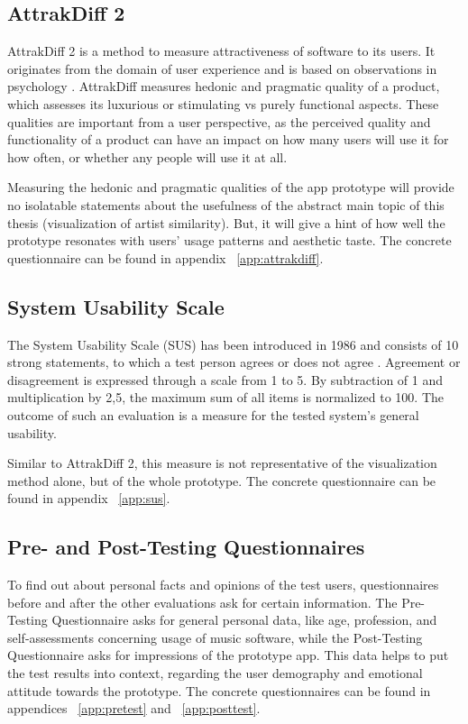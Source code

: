 \subsection{AttrakDiff 2}

AttrakDiff 2 \cite{tubiblio21687} is a method to measure attractiveness of software to its users. It originates from the domain of user experience and is based on observations in psychology \cite{DBLP:journals/ijhci/Hassenzahl01}. AttrakDiff measures hedonic and pragmatic quality of a product, which assesses its luxurious or stimulating vs purely functional aspects. These qualities are important from a user perspective, as the perceived quality and functionality of a product can have an impact on how many users will use it for how often, or whether any people will use it at all.

Measuring the hedonic and pragmatic qualities of the app prototype will provide no isolatable statements about the usefulness of the abstract main topic of this thesis (visualization of artist similarity). But, it will give a hint of how well the prototype resonates with users' usage patterns and aesthetic taste. The concrete questionnaire can be found in appendix ~\ref{app:attrakdiff}.

\subsection{System Usability Scale}

The System Usability Scale (SUS) has been introduced in 1986 and consists of 10 strong statements, to which a test person agrees or does not agree \cite{Lewis:2009}. Agreement or disagreement is expressed through a scale from 1 to 5. By subtraction of 1 and multiplication by 2,5, the maximum sum of all items is normalized to 100. The outcome of such an evaluation is a measure for the tested system's general usability.

Similar to AttrakDiff 2, this measure is not representative of the visualization method alone, but of the whole prototype. The concrete questionnaire can be found in appendix ~\ref{app:sus}.

\subsection{Pre- and Post-Testing Questionnaires}

To find out about personal facts and opinions of the test users, questionnaires before and after the other evaluations ask for certain information. The Pre-Testing Questionnaire asks for general personal data, like age, profession, and self-assessments concerning usage of music software, while the Post-Testing Questionnaire asks for impressions of the prototype app. This data helps to put the test results into context, regarding the user demography and emotional attitude towards the prototype. The concrete questionnaires can be found in appendices ~\ref{app:pretest} and ~\ref{app:posttest}.

